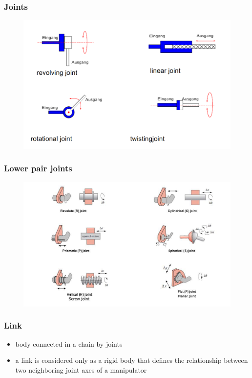 \documentclass[10pt,a4paper]{article}
\begin{document}
\subsubsection{Joints}
\begin{figure}[H]
	\includegraphics[width=1\columnwidth]{imgs/joints}
\end{figure}

\subsubsection{Lower pair joints}
\begin{figure}[H]
	\includegraphics[width=1\columnwidth]{imgs/lower_pair_joints1.jpg}
\end{figure}

\subsubsection{Link}
\begin{itemize}
	\item body connected in a chain by joints
	\item a link is considered only as a rigid body that defines the relationship between two neighboring joint axes of a manipulator
\end{itemize}
\end{document}

